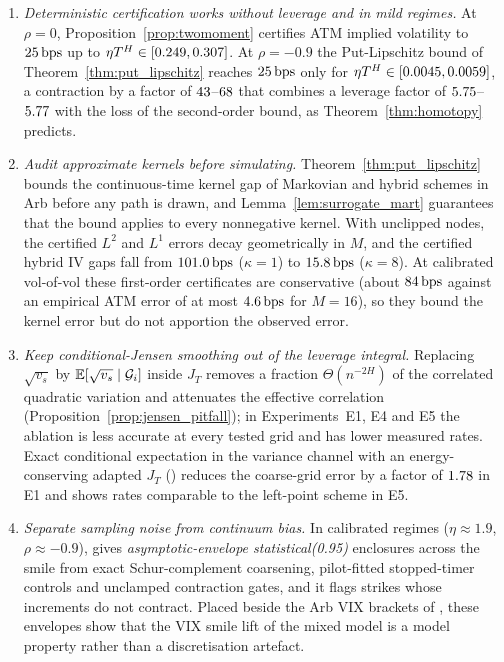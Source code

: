 \begin{enumerate}[1.]
  \item \emph{Deterministic certification works without leverage and in mild regimes.} At $\rho=0$, Proposition~\ref{prop:twomoment} certifies ATM implied volatility to $25\,\mathrm{bps}$ up to $\eta T^H\in[0.249,0.307]$. At $\rho=-0.9$ the Put-Lipschitz bound of Theorem~\ref{thm:put_lipschitz} reaches $25\,\mathrm{bps}$ only for $\eta T^H\in[0.0045,0.0059]$, a contraction by a factor of $43$--$68$ that combines a leverage factor of $5.75$--$5.77$ with the loss of the second-order bound, as Theorem~\ref{thm:homotopy} predicts.
  \item \emph{Audit approximate kernels before simulating.} Theorem~\ref{thm:put_lipschitz} bounds the continuous-time kernel gap of Markovian and hybrid schemes in Arb before any path is drawn, and Lemma~\ref{lem:surrogate_mart} guarantees that the bound applies to every nonnegative kernel. With unclipped nodes, the certified \citet{BayerBreneis2023} $L^2$ and $L^1$ errors decay geometrically in $M$, and the certified hybrid IV gaps fall from $101.0\,\mathrm{bps}$ ($\kappa=1$) to $15.8\,\mathrm{bps}$ ($\kappa=8$). At calibrated vol-of-vol these first-order certificates are conservative (about $84\,\mathrm{bps}$ against an empirical ATM error of at most $4.6\,\mathrm{bps}$ for $M=16$), so they bound the kernel error but do not apportion the observed error.
  \item \emph{Keep conditional-Jensen smoothing out of the leverage integral.} Replacing $\sqrt{v_s}$ by $\mathbb{E}[\sqrt{v_s}\mid\mathcal{G}_i]$ inside $J_T$ removes a fraction $\Theta(n^{-2H})$ of the correlated quadratic variation and attenuates the effective correlation (Proposition~\ref{prop:jensen_pitfall}); in Experiments~E1, E4 and E5 the ablation is less accurate at every tested grid and has lower measured rates. Exact conditional expectation in the variance channel with an energy-conserving adapted $J_T$ (\RCCE{}) reduces the coarse-grid error by a factor of $1.78$ in E1 and shows rates comparable to the left-point scheme in E5.
  \item \emph{Separate sampling noise from continuum bias.} In calibrated regimes ($\eta\approx 1.9$, $\rho\approx -0.9$), \RCBridge{} gives \emph{asymptotic-envelope statistical(0.95)} enclosures across the smile from exact Schur-complement coarsening, pilot-fitted stopped-timer controls and unclamped contraction gates, and it flags strikes whose increments do not contract. Placed beside the Arb VIX brackets of \RoughCert{} \CompanionTag{}, these envelopes show that the VIX smile lift of the mixed model is a model property rather than a discretisation artefact.
\end{enumerate}

